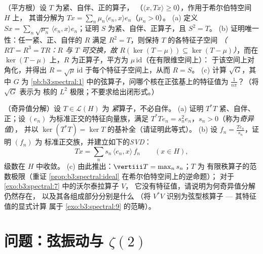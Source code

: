 \begin{exercise}[$\star\star$]\label{exo:b3:spectral:11}
（平方根）设 $T$ 为紧、自伴、正的算子，
（$\langle x, Tx\rangle \geq 0$），作用于希尔伯特空间 $H$ 上，
其谱分解为 $Tx = \sum_n\mu_n\langle e_n,
x\rangle e_n$（$\mu_n > 0$）。
(a) 定义 $Sx = \sum_n\sqrt{\mu_n}\,\langle e_n, x\rangle
e_n$；证明 $S$ 为紧、自伴、正算子，且 $S^2
= T$。
(b) 证明唯一性：任一紧、正、自伴的 $R$
满足 $R^2 = T$，则保持 $T$ 的各特征子空间
\emph{（$RT = R^3 = TR$：$R$ 与 $T$ 可交换，故
$R(\ker(T - \mu)) \subseteq \ker(T - \mu)$）}，而在
$\ker(T - \mu)$ 上，$R$ 为正算子，平方为
$\mu\,\mathrm{id}$（在有限维空间上）：
于该空间上对角化，并得出 $R =
\sqrt\mu\,\mathrm{id}$ 于每个特征子空间上，从而 $R = S$。
(c) 计算 $\sqrt G$，其中 $G$ 为
\cref{pb:b3:spectral:1} 中的弦算子，问哪个核在正弦基上的特征值为
$\frac1{n\pi}$？（将 $\sqrt G$ 表示为
核的 $L^2$ 极限；不要求给出闭形式。）
\end{exercise}

\begin{exercise}[$\star\star\star$]\label{exo:b3:spectral:12}
（奇异值分解）设 $T \in \mathcal L(H)$ 为
\emph{紧}算子，不必自伴。
(a) 证明 $T^*T$ 紧、自伴、正；设
$(e_n)$ 为标准正交的特征向量族，满足
$T^*Te_n = s_n^2e_n$，$s_n > 0$（称为\emph{奇异值}），
并以 $\ker(T^*T) = \ker T$ 的基补全（请证明此等式）。
(b) 设 $f_n = \frac{Te_n}{s_n}$，证明 $(f_n)$ 为
标准正交族，并建立如下的\emph{SVD}：
\[
Tx = \sum_n s_n\,\langle e_n, x\rangle\,f_n
\qquad (x \in H),
\]
级数在 $H$ 中收敛。
(c) 由此推出：$\vertiii T = \max_ns_n$；$T$ 为
有限秩算子的范数极限（重证
\cref{prop:b3:spectral:ideal} 在希尔伯特空间上的逆命题）；
对于 \cref{exo:b3:spectral:7} 中的沃尔泰拉算子 $V$，
它没有特征值，请说明为何奇异值分解仍然存在，
以及其各组成部分分别是什么
（将 $V^*V$ 识别为弦型核算子 ---
其特征值的显式计算
属于 \cref{exo:b3:spectral:9} 的范畴）。
\end{exercise}

\section{问题：弦振动与
\texorpdfstring{$\zeta(2)$}{zeta(2)}}

